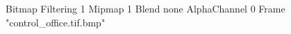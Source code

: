 {Bitmap
	{Filtering 1}
	{Mipmap 1}
	{Blend none}
	{AlphaChannel 0}
	{Frame "control_office.tif.bmp"}
}
